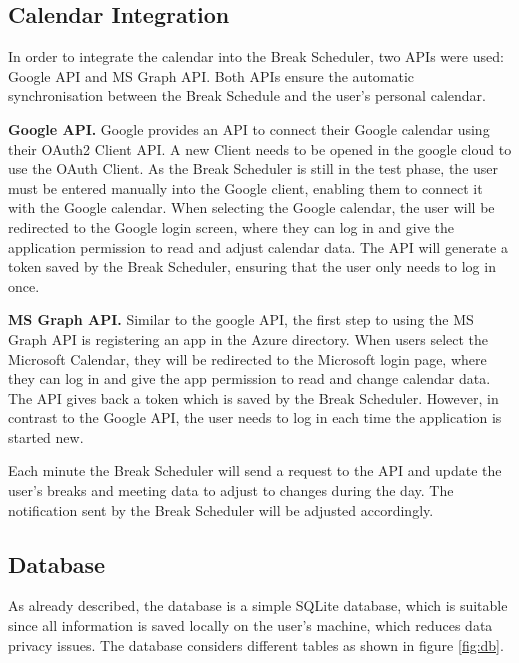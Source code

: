 \documentclass{hasel_thesis}
\begin{document}
\subsection{Calendar Integration} \label{calendar_integration}

In order to integrate the calendar into the Break Scheduler, two APIs were used: Google API and MS Graph API. Both APIs ensure the automatic synchronisation between the Break Schedule and the user's personal calendar. 

\textbf{Google API.} Google provides an API to connect their Google calendar using their OAuth2 Client API. A new Client needs to be opened in the google cloud to use the OAuth Client. As the Break Scheduler is still in the test phase, the user must be entered manually into the Google client, enabling them to connect it with the Google calendar. When selecting the Google calendar, the user will be redirected to the Google login screen, where they can log in and give the application permission to read and adjust calendar data. The API will generate a token saved by the Break Scheduler, ensuring that the user only needs to log in once.

\textbf{MS Graph API.} Similar to the google API, the first step to using the MS Graph API is registering an app in the Azure directory. When users select the Microsoft Calendar, they will be redirected to the Microsoft login page, where they can log in and give the app permission to read and change calendar data. The API gives back a token which is saved by the Break Scheduler. However, in contrast to the Google API, the user needs to log in each time the application is started new.

Each minute the Break Scheduler will send a request to the API and update the user's breaks and meeting data to adjust to changes during the day. The notification sent by the Break Scheduler will be adjusted accordingly.

\subsection{Database} \label{database}
As already described, the database is a simple SQLite database, which is suitable since all information is saved locally on the user's machine, which reduces data privacy issues. The database considers different tables as shown in figure \ref{fig:db}.
\end{document}
